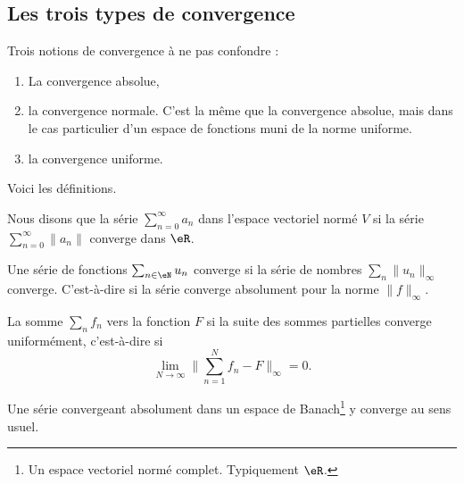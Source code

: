 \subsection{Les trois types de convergence}

Trois notions de convergence à ne pas confondre :
\begin{enumerate}
    \item
        La convergence absolue,
    \item
        la convergence normale. C'est la même que la convergence absolue, mais dans le cas particulier d'un espace de fonctions muni de la norme uniforme.
    \item
        la convergence uniforme.
\end{enumerate}
Voici les définitions.


\begin{definition} \label{DefVFUIXwU}
    Nous disons que la série \( \sum_{n=0}^{\infty}a_n\) dans l'espace vectoriel normé \( V\)  si la série \( \sum_{n=0}^{\infty}\| a_n \|\) converge dans \( \eR\).
\end{definition}

\begin{definition} \label{DefVBrJUxo}
    Une série de fonctions \( \sum_{n\in \eN}u_n \) converge  si la série de nombres \( \sum_n\| u_n \|_{\infty}\) converge. C'est-à-dire si la série converge absolument pour la norme \( \| f \|_{\infty}\).
\end{definition}


\begin{definition}        \label{DEFooPABSooPMXMOV}
    La somme \( \sum_nf_n\)  vers la fonction \( F\) si la suite des sommes partielles converge uniformément, c'est-à-dire si
    \begin{equation}        \label{EqLNCJooVCTiIw}
        \lim_{N\to \infty} \| \sum_{n=1}^Nf_n-F \|_{\infty}=0.
    \end{equation}
\end{definition}

\begin{proposition} \label{PropAKCusNM}
    Une série convergeant absolument dans un espace de Banach\footnote{Un espace vectoriel normé complet. Typiquement \( \eR\).} y converge au sens usuel.
\end{proposition}

